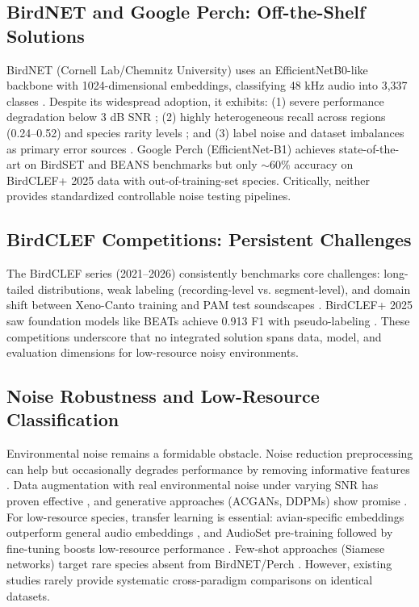\documentclass[conference]{IEEEtran}
\begin{document}
\subsection{BirdNET and Google Perch: Off-the-Shelf Solutions}

BirdNET \cite{kahl2021birdnet} (Cornell Lab/Chemnitz University) uses an EfficientNetB0-like backbone with 1024-dimensional embeddings, classifying 48 kHz audio into 3,337 classes \cite{kahl2025birdnet}. Despite its widespread adoption, it exhibits: (1) severe performance degradation below 3 dB SNR \cite{funosas2026global}; (2) highly heterogeneous recall across regions (0.24--0.52) and species rarity levels \cite{funosas2026global}; and (3) label noise and dataset imbalances as primary error sources \cite{assarzadeh2025investigating}. Google Perch \cite{van2025perch} (EfficientNet-B1) achieves state-of-the-art on BirdSET and BEANS benchmarks \cite{rauch2024birdset, hagiwara2023beans} but only $\sim$60\% accuracy on BirdCLEF+ 2025 data with out-of-training-set species. Critically, neither provides standardized controllable noise testing pipelines.

\subsection{BirdCLEF Competitions: Persistent Challenges}

The BirdCLEF series (2021--2026) consistently benchmarks core challenges: long-tailed distributions, weak labeling (recording-level vs. segment-level), and domain shift between Xeno-Canto training and PAM test soundscapes \cite{birdclef, witting2024addressing}. BirdCLEF+ 2025 saw foundation models like BEATs achieve 0.913 F1 with pseudo-labeling \cite{chen2023beats}. These competitions underscore that no integrated solution spans data, model, and evaluation dimensions for low-resource noisy environments.

\subsection{Noise Robustness and Low-Resource Classification}

Environmental noise remains a formidable obstacle. Noise reduction preprocessing can help but occasionally degrades performance by removing informative features \cite{denton2022separation}. Data augmentation with real environmental noise under varying SNR has proven effective \cite{birdclef, miyaguchi2023transfer}, and generative approaches (ACGANs, DDPMs) show promise \cite{generative2024}. For low-resource species, transfer learning is essential: avian-specific embeddings outperform general audio embeddings \cite{ghani2023global}, and AudioSet pre-training followed by fine-tuning boosts low-resource performance \cite{gemmeke2017audio, ghani2023global}. Few-shot approaches (Siamese networks) target rare species absent from BirdNET/Perch \cite{fewshot2023}. However, existing studies rarely provide systematic cross-paradigm comparisons on identical datasets.
\end{document}
